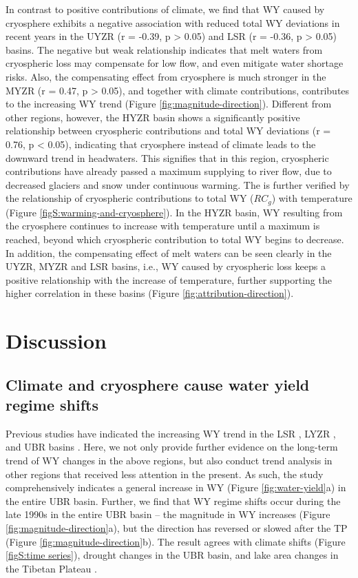 \documentclass[hess, manuscript]{copernicus}
\begin{document}
In contrast to positive contributions of climate, we find that WY caused by cryosphere exhibits a negative association with reduced total WY deviations in recent years in the UYZR (r = -0.39, p > 0.05) and LSR (r = -0.36, p > 0.05) basins. 
The negative but weak relationship indicates that melt waters from cryospheric loss may compensate for low flow, and even mitigate water shortage risks. 
Also, the compensating effect from cryosphere is much stronger in the MYZR (r = 0.47, p > 0.05), and together with climate contributions, contributes to the increasing WY trend (Figure \ref{fig:magnitude-direction}).
Different from other regions, however, the HYZR basin shows a significantly positive relationship between cryospheric contributions and total WY deviations (r = 0.76, p < 0.05), indicating that cryosphere instead of climate leads to the downward trend in headwaters.
This signifies that in this region, cryospheric contributions have already passed a maximum supplying to river flow, due to decreased glaciers and snow under continuous warming. 
The is further verified by the relationship of cryospheric contributions to total WY ($RC_g$) with temperature (Figure \ref{figS:warming-and-cryosphere}). 
In the HYZR basin, WY resulting from the cryosphere continues to increase with temperature until a maximum is reached, beyond which cryospheric contribution to total WY begins to decrease. 
In addition, the compensating effect of melt waters can be seen clearly in the UYZR, MYZR and LSR basins, i.e., WY caused by cryospheric loss keeps a positive relationship with the increase of temperature, further supporting the higher correlation in these basins (Figure \ref{fig:attribution-direction}).

\section{Discussion}
\subsection{Climate and cryosphere cause water yield regime shifts}
Previous studies have indicated the increasing WY trend in the LSR \citep{linhess2020}, LYZR \citep{zhangech2011}, and UBR basins \citep{li2021vegetation}. Here, we not only provide further evidence on the long-term trend of WY changes in the above regions, but also conduct trend analysis in other regions that received less attention in the present. 
As such, the study comprehensively indicates a general increase in WY (Figure \ref{fig:water-yield}a) in the entire UBR basin. 
Further, we find that WY regime shifts occur during the late 1990s in the entire UBR basin -- the magnitude in WY increases (Figure \ref{fig:magnitude-direction}a), but the direction has reversed or slowed after the TP (Figure \ref{fig:magnitude-direction}b). The result agrees with climate shifts (Figure \ref{figS:time series}), drought changes \citep{li2019spatiotemporal} in the UBR basin, and lake area changes in the Tibetan Plateau \citep{zhang2017}.
\end{document}
